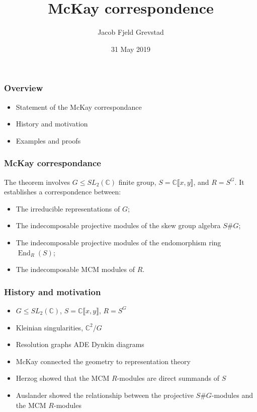 \documentclass[screen, aspectratio=43]{beamer}
\title{McKay correspondence}
\author[J. F. Grevstad]{Jacob Fjeld Grevstad}
\institute[NTNU]{Department of Mathematical sciences, NTNU}
\date{31 May 2019}
\theoremstyle{definition}
\newcommand{\C}{\mathbb{C}}
\DeclareMathOperator{\End}{End}
\begin{document}
\begin{frame}
  \titlepage
\end{frame}


\begin{frame}
	\frametitle{Overview}
	\begin{itemize}
		\item Statement of the McKay correspondance
		\item History and motivation
		\item Examples and proofs
	\end{itemize}
\end{frame}

\begin{frame}
	\frametitle{McKay correspondance}
	The theorem involves $G \leq SL_2(\C)$ finite group, $S= \C \llbracket x, y \rrbracket$, and $R = S^G$. It establishes a correspondence between:
	\begin{itemize}
		\item The irreducible representations of $G$; 
		\item The indecomposable projective modules of the skew group algebra $S\#G$;
		\item The indecomposable projective modules of the endomorphism ring $\End_R(S)$;
		\item The indecomposable MCM modules of $R$.
	\end{itemize}
\end{frame}

\begin{frame}
	\frametitle{History and motivation}
	\begin{itemize}
		\item $G \leq SL_2(\C)$,  $S = \C\llbracket x, y \rrbracket$, $R = S^G$
		\item Kleinian singularities, $\C^2 / G$
		\item Resolution graphs ADE Dynkin diagrams 
		\item McKay connected the geometry to representation theory
		\item Herzog showed that the MCM $R$-modules are direct summands of $S$
		\item Auslander showed the relationship between the projective $S\#G$-modules and the MCM $R$-modules
	\end{itemize}
\end{frame}
\end{document}

